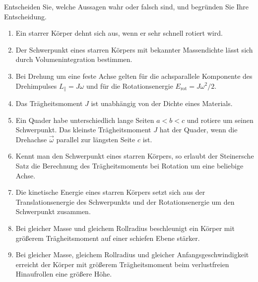 \begin{ExerciseBlock}
Entscheiden Sie, welche Aussagen wahr oder falsch sind, und begründen Sie Ihre Entscheidung.
\begin{enumerate}
\item Ein starrer Körper dehnt sich aus, wenn er sehr schnell rotiert wird.
\item Der Schwerpunkt eines starren Körpers mit bekannter Massendichte lässt sich durch Volumenintegration bestimmen.
\item Bei Drehung um eine feste Achse gelten für die achsparallele Komponente des Drehimpulses $L_\parallel=J\omega$ und für die Rotationsenergie $E_\mathrm{rot}=J\omega^2/2$.
\item Das Trägheitsmoment $J$ ist unabhängig von der Dichte eines Materials.
\item Ein Quader habe unterschiedlich lange Seiten $a<b<c$ und rotiere um seinen Schwerpunkt. Das kleinste Trägheitsmoment $J$ hat der Quader, wenn die Drehachse $\vec{\omega}$ parallel zur längsten Seite $c$ ist.
\item Kennt man den Schwerpunkt eines starren Körpers, so erlaubt der Steinersche Satz die Berechnung des Trägheitsmoments bei Rotation um eine beliebige Achse.
\item Die kinetische Energie eines starren Körpers setzt sich aus der Translationsenergie des Schwerpunkts und der Rotationsenergie um den Schwerpunkt zusammen.
\item Bei gleicher Masse und gleichem Rollradius beschleunigt ein Körper mit größerem Trägheitsmoment auf einer schiefen Ebene stärker.
\item Bei gleicher Masse, gleichem Rollradius und gleicher Anfangsgeschwindigkeit erreicht der Körper mit größerem Trägheitsmoment beim verlustfreien Hinaufrollen eine größere Höhe.
\end{enumerate}
\end{ExerciseBlock}

